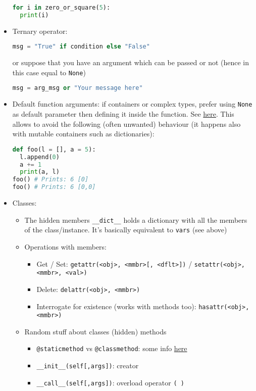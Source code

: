 \documentclass[a4paper,12pt,%
              final%
              ]{article}
\begin{document}
\begin{itemize}
\begin{lstlisting}[language=python]
for i in zero_or_square(5):
  print(i)
\end{lstlisting}
  \item Ternary operator:
\begin{lstlisting}[language=python]
msg = "True" if condition else "False"
\end{lstlisting}
    or suppose that you have an argument which can be passed or not (hence in this case equal to \verb|None|)
\begin{lstlisting}[language=python]
msg = arg_msg or "Your message here"
\end{lstlisting}
  \item Default function arguments: if containers or complex types, prefer using \verb|None| as default parameter then defining it inside the function. See \href{https://www.geeksforgeeks.org/default-arguments-in-python/}{here}. This allows to avoid the following (often unwanted) behaviour (it happens also with mutable containers such as dictionaries):
\begin{lstlisting}[language=python]
def foo(l = [], a = 5):
  l.append(0)
  a += 1
  print(a, l)
foo() # Prints: 6 [0]
foo() # Prints: 6 [0,0]
\end{lstlisting}
  \item Classes:
    \begin{itemize}
      \item The hidden members \verb|__dict__| holds a dictionary with all the members of the class/instance. It's basically equivalent to \verb|vars| (see above)
      \item Operations with members:
        \begin{itemize}
          \item Get / Set: \verb|getattr(<obj>, <mmbr>[, <dflt>])| / \verb|setattr(<obj>, <mmbr>, <val>)|
          \item Delete: \verb|delattr(<obj>, <mmbr>)|
          \item Interrogate for existence (works with methods too): \verb|hasattr(<obj>, <mmbr>)|
        \end{itemize}
      \item Random stuff about classes (hidden) methods
        \begin{itemize}
          \item \verb|@staticmethod| vs \verb|@classmethod|: some info \href{https://www.geeksforgeeks.org/class-method-vs-static-method-python/}{here}
          \item \verb|__init__(self[,args])|: creator
          \item \verb|__call__(self[,args])|: overload operator \verb|( )|

\end{itemize}
\end{itemize}
\end{itemize}
\end{document}
